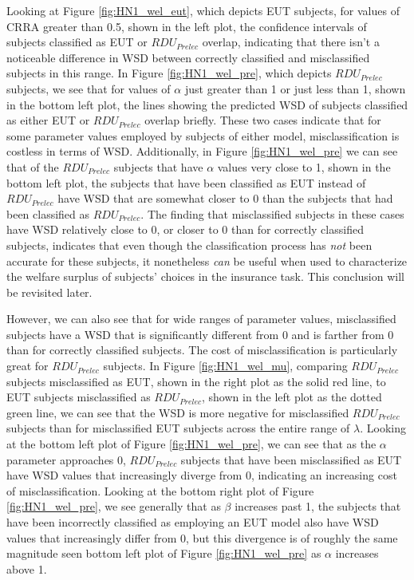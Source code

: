 \documentclass[../main.tex]{subfiles}
\begin{document}
Looking at Figure \ref{fig:HN1_wel_eut}, which depicts EUT subjects, for values of CRRA greater than 0.5, shown in the left plot, the confidence intervals of subjects classified as EUT or $\mathit{RDU_{Prelec}}$ overlap, indicating that there isn't a noticeable difference in WSD between correctly classified and misclassified subjects in this range.
In Figure \ref{fig:HN1_wel_pre}, which depicts $\mathit{RDU_{Prelec}}$ subjects, we see that for values of $\alpha$ just greater than 1 or just less than 1, shown in the bottom left plot, the lines showing the predicted WSD of subjects classified as either EUT or $\mathit{RDU_{Prelec}}$ overlap briefly.
These two cases indicate that for some parameter values employed by subjects of either model, misclassification is costless in terms of WSD.
Additionally, in Figure \ref{fig:HN1_wel_pre} we can see that of the $\mathit{RDU_{Prelec}}$ subjects that have $\alpha$ values very close to 1, shown in the bottom left plot, the subjects that have been classified as EUT instead of $\mathit{RDU_{Prelec}}$ have WSD that are somewhat closer to 0 than the subjects that had been classified as $\mathit{RDU_{Prelec}}$.
The finding that misclassified subjects in these cases have WSD relatively close to 0, or closer to 0 than for correctly classified subjects, indicates that even though the classification process has \textit{not} been accurate for these subjects, it nonetheless \textit{can} be useful when used to characterize the welfare surplus of subjects' choices in the insurance task.
This conclusion will be revisited later.

However, we can also see that for wide ranges of parameter values, misclassified subjects have a WSD that is significantly different from 0 and is farther from 0 than for correctly classified subjects.
The cost of misclassification is particularly great for $\mathit{RDU_{Prelec}}$ subjects.
In Figure \ref{fig:HN1_wel_mu}, comparing $\mathit{RDU_{Prelec}}$ subjects misclassified as EUT, shown in the right plot as the solid red line, to EUT subjects misclassified as $\mathit{RDU_{Prelec}}$, shown in the left plot as the dotted green line, we can see that the WSD is more negative for misclassified $\mathit{RDU_{Prelec}}$ subjects than for misclassified EUT subjects across the entire range of $\lambda$.
Looking at the bottom left plot of Figure \ref{fig:HN1_wel_pre}, we can see that as the $\alpha$ parameter approaches 0, $\mathit{RDU_{Prelec}}$ subjects that have been misclassified as EUT have WSD values that increasingly diverge from 0, indicating an increasing cost of misclassification.
Looking at the bottom right plot of  Figure \ref{fig:HN1_wel_pre}, we see generally that as $\beta$ increases past 1, the subjects that have been incorrectly classified as employing an EUT model also have WSD values that increasingly differ from 0, but this divergence is of roughly the same magnitude seen bottom left plot of Figure \ref{fig:HN1_wel_pre} as $\alpha$ increases above 1.
\end{document}
